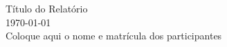 \documentclass[12pt]{article}
\begin{document}

\begin{center}
  \Large Título do Relatório \\ 
  \normalsize \today \\ 
  Coloque aqui o nome e matrícula dos participantes
\end{center}



\end{document}
